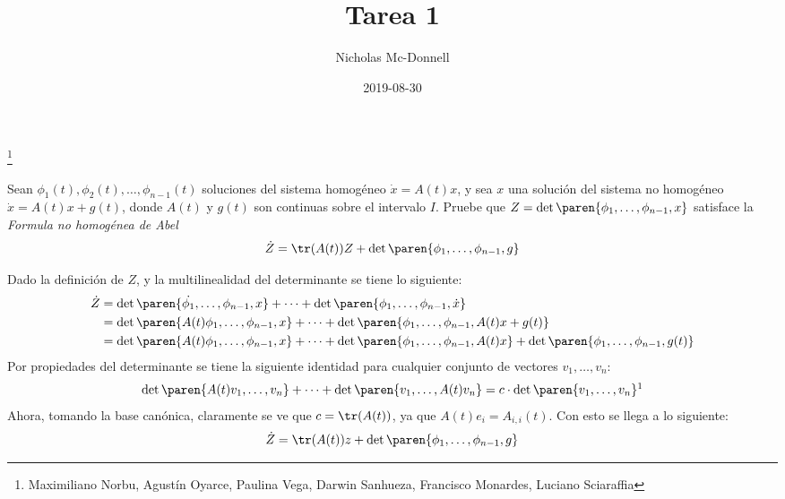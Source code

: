 \documentclass{homework}
\title{Tarea 1}
\date{2019-08-30}
\author{Nicholas Mc-Donnell}
\begin{document}
\maketitle
\thanks{Maximiliano Norbu, Agustín Oyarce, Paulina Vega, Darwin Sanhueza, Francisco Monardes, Luciano Sciaraffia}
\newpage
\tableofcontents
\newpage
{}

\begin{prob}
    Sean \(\phi_1(t),\phi_2(t),\dots,\phi_{n-1}(t)\) soluciones del sistema homogéneo \(\dot{x}=A(t)x\), y sea \(x\) una solución del sistema no homogéneo \(\dot{x}=A(t)x+g(t)\), donde \(A(t)\) y \(g(t)\) son continuas sobre el intervalo \(I\). Pruebe que \(Z=\det\paren{\phi_1,\dots,\phi_{n-1},x}\) satisface la \textit{Formula no homogénea de Abel}
    \[\dot{Z}=\tr(A(t))Z+\det\paren{\phi_1,\dots,\phi_{n-1},g}\]
\end{prob}

\begin{sol}
    Dado la definición de \(Z\), y la multilinealidad del determinante se tiene lo siguiente:
    \begin{align*}
        \dot{Z}&=\det\paren{\dot{\phi_1},\dots,\phi_{n-1},x}+\dots+\det\paren{\phi_1,\dots,\phi_{n-1},\dot{x}}\\
        &=\det\paren{A(t)\phi_1,\dots,\phi_{n-1},x}+\dots+\det\paren{\phi_1,\dots,\phi_{n-1},A(t)x+g(t)}\\
        &=\det\paren{A(t)\phi_1,\dots,\phi_{n-1},x}+\dots+\det\paren{\phi_1,\dots,\phi_{n-1},A(t)x}+\det\paren{\phi_1,\dots,\phi_{n-1},g(t)}
    \end{align*}
    Por propiedades del determinante se tiene la siguiente identidad para cualquier conjunto de vectores \(v_1,\dots,v_n\):
    \[\det\paren{A(t)v_1,\dots,v_n}+\dots+\det\paren{v_1,\dots,A(t)v_n}=c\cdot\det\paren{v_1,\dots,v_n}\footnotemark\]
    Ahora, tomando la base canónica, claramente se ve que \(c=\tr(A(t))\), ya que \(A(t)e_i=A_{i,i}(t)\). Con esto se llega a lo siguiente:
    \[\dot{Z}=\tr(A(t))z+\det\paren{\phi_1,\dots,\phi_{n-1},g}\]
\end{sol}
\end{document}
